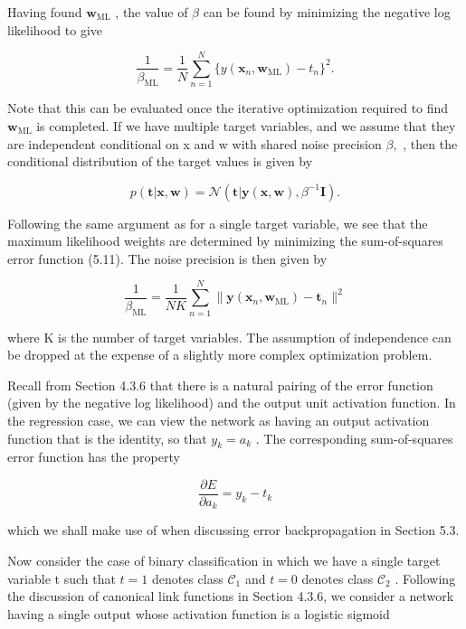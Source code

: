 \documentclass[
  10
]{article}
\begin{document}
Having found \(\mathbf { w } _ { \mathrm { M L } }\) , the value of
\(\beta\) can be found by minimizing the negative log likelihood to give

\[
\frac {1}{\beta_ {\mathrm{ML}}} = \frac {1}{N} \sum_ {n = 1} ^ {N} \{y (\mathbf {x} _ {n}, \mathbf {w} _ {\mathrm{ML}}) - t _ {n} \} ^ {2}.\tag{5.15}
\]

Note that this can be evaluated once the iterative optimization required
to find \(\mathbf { w } _ { \mathrm { M L } }\) is completed. If we have
multiple target variables, and we assume that they are independent
conditional on x and w with shared noise precision \(\beta ,\) , then
the conditional distribution of the target values is given by

\[
p (\mathbf {t} | \mathbf {x}, \mathbf {w}) = \mathcal {N} \left(\mathbf {t} | \mathbf {y} (\mathbf {x}, \mathbf {w}), \beta^ {- 1} \mathbf {I}\right).\tag{5.16}
\]

Following the same argument as for a single target variable, we see that
the maximum likelihood weights are determined by minimizing the
sum-of-squares error function (5.11). The noise precision is then given
by

\[
\frac {1}{\beta_ {\mathrm{ML}}} = \frac {1}{N K} \sum_ {n = 1} ^ {N} \| \mathbf {y} (\mathbf {x} _ {n}, \mathbf {w} _ {\mathrm{ML}}) - \mathbf {t} _ {n} \| ^ {2}\tag{5.17}
\]

where K is the number of target variables. The assumption of
independence can be dropped at the expense of a slightly more complex
optimization problem.

Recall from Section 4.3.6 that there is a natural pairing of the error
function (given by the negative log likelihood) and the output unit
activation function. In the regression case, we can view the network as
having an output activation function that is the identity, so that
\(y _ { k } = a _ { k }\) . The corresponding sum-of-squares error
function has the property

\[
\frac {\partial E}{\partial a _ {k}} = y _ {k} - t _ {k}\tag{5.18}
\]

which we shall make use of when discussing error backpropagation in
Section 5.3.

Now consider the case of binary classification in which we have a single
target variable t such that \(t = 1\) denotes class
\(\mathcal { C } _ { 1 }\) and \(t = 0\) denotes class
\(\mathcal { C } _ { 2 }\) . Following the discussion of canonical link
functions in Section 4.3.6, we consider a network having a single output
whose activation function is a logistic sigmoid
\end{document}
